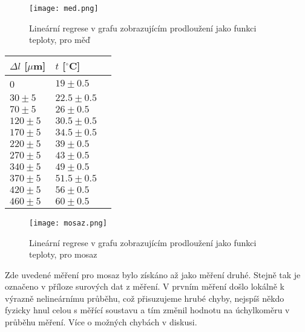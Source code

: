 \documentclass{article}
\begin{document}
\begin{figure}[H]
\centering
\texttt{[image: med.png]}
\caption{Lineární regrese v grafu zobrazujícím prodloužení jako funkci teploty, pro měď}
\end{figure}
\begin{center}
    \label{tab:title}
    \begin{tabular}{ | l | l  | p{4cm} |} \hline
    $\Delta l$ [$\mu$m] & $t$ [$^\circ$C] \\ \hline
    0 & $19\pm0.5$ \\ \hline
    $30\pm5$ & $22.5\pm0.5$ \\ \hline
    $70\pm5$ & $26\pm0.5$ \\ \hline
    $120\pm5$ & $30.5\pm0.5$ \\ \hline
    $170\pm5$ & $34.5\pm0.5$ \\ \hline
    $220\pm5$ & $39\pm0.5$ \\ \hline
    $270\pm5$ & $43\pm0.5$ \\ \hline
    $340\pm5$ & $49\pm0.5$ \\ \hline
    $370\pm5$ & $51.5\pm0.5$ \\ \hline
    $420\pm5$ & $56\pm0.5$ \\ \hline
    $460\pm5$ & $60\pm0.5$ \\ \hline
    \end{tabular}
\end{center}
\begin{figure}[H]
\centering
\texttt{[image: mosaz.png]}
\caption{Lineární regrese v grafu zobrazujícím prodloužení jako funkci teploty, pro mosaz}
\end{figure}
Zde uvedené měření pro mosaz bylo získáno až jako měření druhé. Stejně tak je označeno v příloze surových dat z měření. V prvním měření došlo lokálně k výrazně nelineárnímu průběhu, což přisuzujeme hrubé chyby, nejspíš někdo fyzicky hnul celou s měřící soustavu a tím změnil hodnotu na úchylkoměru v průběhu měření. Více o možných chybách v diskusi.
\end{document}
